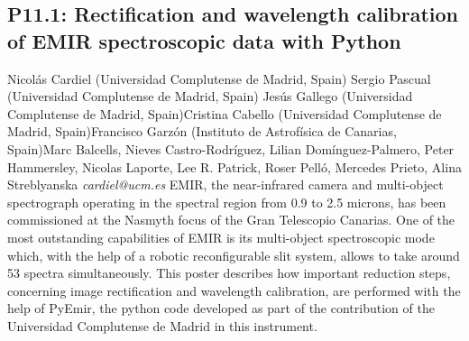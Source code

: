 \documentclass{report}
\begin{document}
\subsection*{P11.1: Rectification and wavelength calibration of EMIR spectroscopic data with Python}
\bigskip
Nicolás Cardiel (Universidad Complutense de Madrid, Spain) \newline Sergio Pascual (Universidad Complutense de Madrid, Spain) \newline  Jesús Gallego (Universidad Complutense de Madrid, Spain)\newline  Cristina Cabello (Universidad Complutense de Madrid, Spain)\newline Francisco Garzón (Instituto de Astrofísica de Canarias, Spain)\newline  Marc Balcells,
Nieves Castro-Rodríguez,
Lilian Domínguez-Palmero,
Peter Hammersley,
Nicolas Laporte,
Lee R. Patrick,
Roser Pelló,
Mercedes Prieto,
Alina Streblyanska\newline\newline
{\it cardiel@ucm.es}\newline
\newline\newline
EMIR, the near-infrared camera and multi-object spectrograph operating in the spectral region from 0.9 to 2.5 microns, has been commissioned at the Nasmyth focus of the Gran Telescopio Canarias. One of the most outstanding capabilities of EMIR is its multi-object spectroscopic mode which, with the help of a robotic reconfigurable slit system, allows to take around 53 spectra simultaneously. This poster describes how important reduction steps, concerning image rectification and wavelength calibration, are performed with the help of PyEmir, the python code developed as part of the contribution of the Universidad Complutense de Madrid in this instrument.\newline
\newpage
\end{document}
